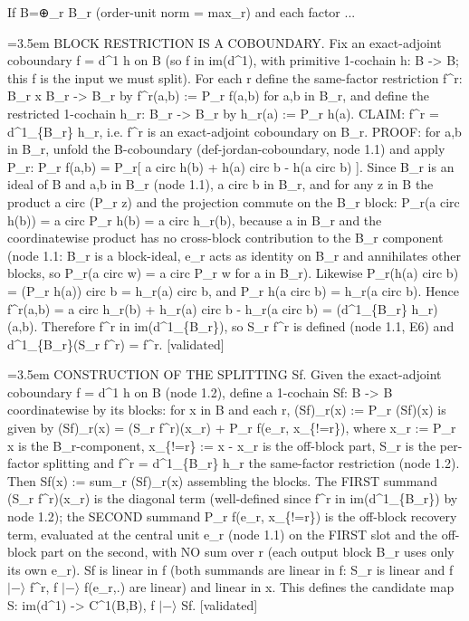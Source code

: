 \documentclass{article}
\newcommand{\step}[1]{\par\noindent\hangindent=3.5em\hangafter=1%
  \makebox[3.5em][l]{\textbf{#1.}}}
\newcommand{\steptag}[1]{\hfill{\small\textsf{[#1]}}}
\begin{document}
\begin{proofbox}{If B=⊕\_r B\_r (order-unit norm = max\_r) and each factor ...}
\step{1.2} BLOCK RESTRICTION IS A COBOUNDARY. Fix an exact-adjoint coboundary f = d\textasciicircum{}1 h on B (so f in im(d\textasciicircum{}1), with primitive 1-cochain h: B -> B; this f is the input we must split). For each r define the same-factor restriction f\textasciicircum{}r: B\_r x B\_r -> B\_r by f\textasciicircum{}r(a,b) := P\_r f(a,b) for a,b in B\_r, and define the restricted 1-cochain h\_r: B\_r -> B\_r by h\_r(a) := P\_r h(a). CLAIM: f\textasciicircum{}r = d\textasciicircum{}1\_\{B\_r\} h\_r, i.e. f\textasciicircum{}r is an exact-adjoint coboundary on B\_r. PROOF: for a,b in B\_r, unfold the B-coboundary (def-jordan-coboundary, node 1.1) and apply P\_r: P\_r f(a,b) = P\_r[ a circ h(b) + h(a) circ b - h(a circ b) ]. Since B\_r is an ideal of B and a,b in B\_r (node 1.1), a circ b in B\_r, and for any z in B the product a circ (P\_r z) and the projection commute on the B\_r block: P\_r(a circ h(b)) = a circ P\_r h(b) = a circ h\_r(b), because a in B\_r and the coordinatewise product has no cross-block contribution to the B\_r component (node 1.1: B\_r is a block-ideal, e\_r acts as identity on B\_r and annihilates other blocks, so P\_r(a circ w) = a circ P\_r w for a in B\_r). Likewise P\_r(h(a) circ b) = (P\_r h(a)) circ b = h\_r(a) circ b, and P\_r h(a circ b) = h\_r(a circ b). Hence f\textasciicircum{}r(a,b) = a circ h\_r(b) + h\_r(a) circ b - h\_r(a circ b) = (d\textasciicircum{}1\_\{B\_r\} h\_r)(a,b). Therefore f\textasciicircum{}r in im(d\textasciicircum{}1\_\{B\_r\}), so S\_r f\textasciicircum{}r is defined (node 1.1, E6) and d\textasciicircum{}1\_\{B\_r\}(S\_r f\textasciicircum{}r) = f\textasciicircum{}r. \steptag{validated} \\[4pt]
\step{1.3} CONSTRUCTION OF THE SPLITTING Sf. Given the exact-adjoint coboundary f = d\textasciicircum{}1 h on B (node 1.2), define a 1-cochain Sf: B -> B coordinatewise by its blocks: for x in B and each r, (Sf)\_r(x) := P\_r (Sf)(x) is given by (Sf)\_r(x) = (S\_r f\textasciicircum{}r)(x\_r) + P\_r f(e\_r, x\_\{!=r\}), where x\_r := P\_r x is the B\_r-component, x\_\{!=r\} := x - x\_r is the off-block part, S\_r is the per-factor splitting and f\textasciicircum{}r = d\textasciicircum{}1\_\{B\_r\} h\_r the same-factor restriction (node 1.2). Then Sf(x) := sum\_r (Sf)\_r(x) assembling the blocks. The FIRST summand (S\_r f\textasciicircum{}r)(x\_r) is the diagonal term (well-defined since f\textasciicircum{}r in im(d\textasciicircum{}1\_\{B\_r\}) by node 1.2); the SECOND summand P\_r f(e\_r, x\_\{!=r\}) is the off-block recovery term, evaluated at the central unit e\_r (node 1.1) on the FIRST slot and the off-block part on the second, with NO sum over r (each output block B\_r uses only its own e\_r). Sf is linear in f (both summands are linear in f: S\_r is linear and f $|-\rangle$ f\textasciicircum{}r, f $|-\rangle$ f(e\_r,.) are linear) and linear in x. This defines the candidate map S: im(d\textasciicircum{}1) -> C\textasciicircum{}1(B,B), f $|-\rangle$ Sf. \steptag{validated} \\[4pt]

\end{proofbox}
\end{document}
